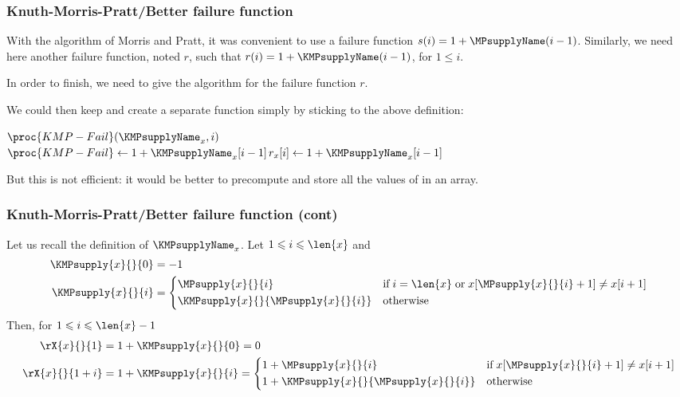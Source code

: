 %
\begin{frame}
\frametitle{Knuth-Morris-Pratt/Better failure function}

With the algorithm of Morris and Pratt, it was convenient to use a
failure function \(s(i) = 1 + \MPsupplyName(i-1)\). Similarly, we need
here another failure function, noted \(r\), such that \(r(i) = 1 +
\KMPsupplyName(i-1)\), for \(1 \leqslant i\).

\bigskip

In order to finish, we need to give the algorithm for the failure
function \(r\).

\bigskip

We could then keep  and create a separate function
 simply by sticking to the above definition:
\begin{codebox}
\(\proc{KMP-Fail} (\KMPsupplyName_{x}, i)\)\\
\li \(\proc{KMP-Fail} \gets 1 + \KMPsupplyName_{x}[i-1]\)\RComment \(r_{x}[i] \gets 1 + \KMPsupplyName_{x}[i-1]\)
\end{codebox}
But this is not efficient: it would be better to precompute
and store all the values of  in an array.

\end{frame}

%
\begin{frame}
\frametitle{Knuth-Morris-Pratt/Better failure function (cont)}

Let us recall the definition of \(\KMPsupplyName_{x}\). Let \(1
\leqslant i \leqslant \len{x}\) and
\begin{align*}
\KMPsupply{x}{}{0} &= -1\\
  \KMPsupply{x}{}{i}
&= \left\lbrace
  \begin{aligned}
    &  \MPsupply{x}{}{i}
    && \text{if} \; i = \len{x} \; \text{or} 
       \; x [\MPsupply{x}{}{i} + 1] \neq x [i + 1]\\
    &  \KMPsupply{x}{}{\MPsupply{x}{}{i}}
    && \text{otherwise}
  \end{aligned}
  \right.
\end{align*}
Then, for \(1 \leqslant i \leqslant \len{x}-1\)
\begin{align*}
   \rX{x}{}{1} 
&= 1 + \KMPsupply{x}{}{0} = 0\\
   \rX{x}{}{1+i}
&= 1 + \KMPsupply{x}{}{i}
 = \left\lbrace
   \begin{aligned}
   & 1 + \MPsupply{x}{}{i}
   && \text{if} \; x [\MPsupply{x}{}{i} + 1] \neq x [i + 1]\\
   & 1 + \KMPsupply{x}{}{\MPsupply{x}{}{i}}
   && \text{otherwise}
   \end{aligned}
   \right.
\end{align*}

\end{frame}

